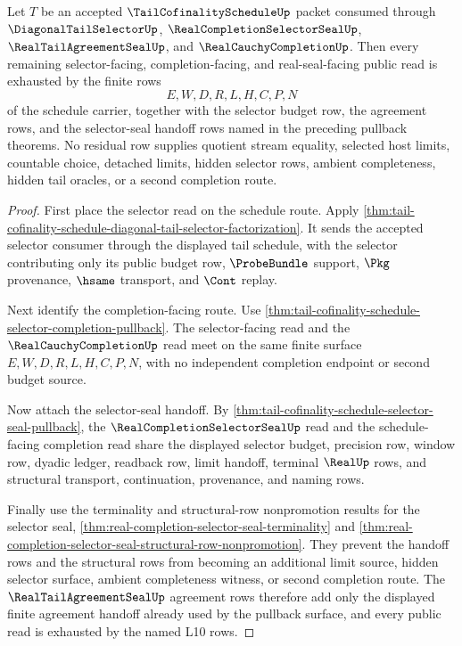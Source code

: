 \begin{theorem}
\label{thm:tail-cofinality-schedule-selector-residue-exhaustion}
Let $T$ be an accepted $\TailCofinalityScheduleUp$ packet consumed through
$\DiagonalTailSelectorUp$, $\RealCompletionSelectorSealUp$,
$\RealTailAgreementSealUp$, and $\RealCauchyCompletionUp$. Then every remaining
selector-facing, completion-facing, and real-seal-facing public read is
exhausted by the finite rows
$$
E,W,D,R,L,H,C,P,N
$$
of the schedule carrier, together with the selector budget row, the agreement
rows, and the selector-seal handoff rows named in the preceding pullback
theorems. No residual row supplies quotient stream equality, selected host
limits, countable choice, detached limits, hidden selector rows, ambient
completeness, hidden tail oracles, or a second completion route.
\end{theorem}
\begin{proof}
First place the selector read on the schedule route. Apply
\autoref{thm:tail-cofinality-schedule-diagonal-tail-selector-factorization}.
It sends the accepted selector consumer through the displayed tail schedule,
with the selector contributing only its public budget row, $\ProbeBundle$
support, $\Pkg$ provenance, $\hsame$ transport, and $\Cont$ replay.

Next identify the completion-facing route. Use
\autoref{thm:tail-cofinality-schedule-selector-completion-pullback}. The
selector-facing read and the $\RealCauchyCompletionUp$ read meet on the same
finite surface $E,W,D,R,L,H,C,P,N$, with no independent completion endpoint or
second budget source.

Now attach the selector-seal handoff. By
\autoref{thm:tail-cofinality-schedule-selector-seal-pullback}, the
$\RealCompletionSelectorSealUp$ read and the schedule-facing completion read
share the displayed selector budget, precision row, window row, dyadic ledger,
readback row, limit handoff, terminal $\RealUp$ rows, and structural
transport, continuation, provenance, and naming rows.

Finally use the terminality and structural-row nonpromotion results for the
selector seal,
\autoref{thm:real-completion-selector-seal-terminality} and
\autoref{thm:real-completion-selector-seal-structural-row-nonpromotion}. They
prevent the handoff rows and the structural rows from becoming an additional
limit source, hidden selector surface, ambient completeness witness, or second
completion route. The $\RealTailAgreementSealUp$ agreement rows therefore add
only the displayed finite agreement handoff already used by the pullback
surface, and every public read is exhausted by the named L10 rows.
\end{proof}

